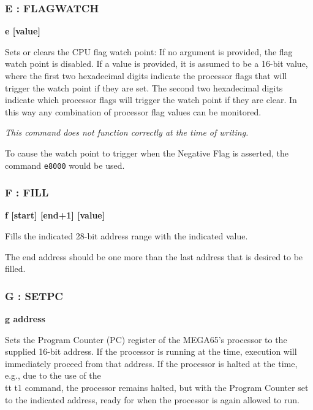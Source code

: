 \subsubsection{E : FLAGWATCH}
\begin{description}[leftmargin=2cm,style=nextline]
\item [Format:] {\bf e [value]}
\item [Usage:]
  Sets or clears the CPU flag watch point: If no argument is provided, the
  flag watch point is disabled. If a value is provided, it is assumed to be
  a 16-bit value, where the first two hexadecimal digits indicate the processor
  flags that will trigger the watch point if they are set. The second two
  hexadecimal digits indicate which processor flags will trigger the watch point
  if they are clear.  In this way any combination of processor flag values can
  be monitored.

  {\em This command does not function correctly at the time of writing.}

\item [Example:]

  To cause the watch point to trigger when the Negative Flag is asserted, the
  command {\tt e8000} would be used.

\end{description}

\subsubsection{F : FILL}
\begin{description}[leftmargin=2cm,style=nextline]
\item [Format:] {\bf f [start] [end+1] [value] }
\item [Usage:] Fills the indicated 28-bit address range with
  the indicated value.
\item [Remarks:]
  The end address should be one more than the last address
  that is desired to be filled.

\end{description}

\subsubsection{G : SETPC}
\begin{description}[leftmargin=2cm,style=nextline]
\item [Format:] {\bf g address}
\item [Usage:] Sets the Program Counter (PC) register of the MEGA65's processor
  to the supplied 16-bit address.  If the processor is running at the time, execution
  will immediately proceed from that address. If the processor is halted at the time,
  e.g., due to the use of the {\\tt t1} command, the processor remains halted, but with
  the Program Counter set to the indicated address, ready for when the processor is
  again allowed to run.

\end{description}


